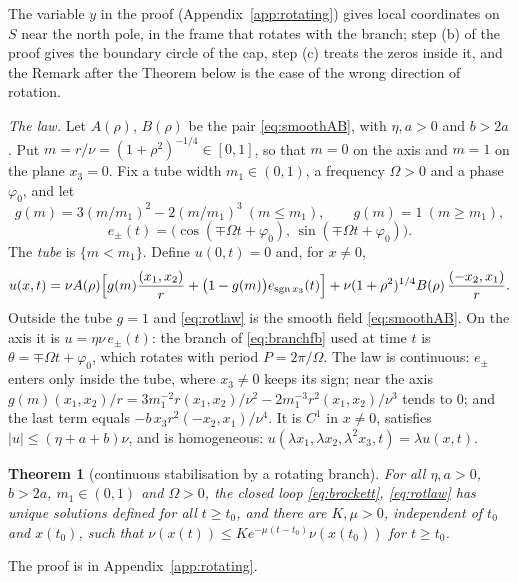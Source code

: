 \documentclass[11pt,reqno]{amsart}
\theoremstyle{plain}
\newtheorem*{theorem}{Theorem}
\theoremstyle{definition}
\theoremstyle{remark}
\begin{document}
The variable $y$ in the proof (Appendix~\ref{app:rotating}) gives local coordinates on $S$ near the north pole, in the frame that rotates with the branch; step (b) of the proof gives the boundary circle of the cap, step (c) treats the zeros inside it, and the
Remark after the Theorem below is the case of the wrong direction of rotation.

\emph{The law.} Let $A(\rho)$, $B(\rho)$ be the pair \eqref{eq:smoothAB}, with $\eta,a>0$ and $b>2a$. Put
$m=r/\nu=(1+\rho^{2})^{-1/4}\in[0,1]$, so that $m=0$ on the axis and $m=1$ on the plane $x_3=0$. Fix a tube
width $m_1\in(0,1)$, a frequency $\Omega>0$ and a phase $\varphi_0$, and let
\[
  g(m)=3(m/m_1)^{2}-2(m/m_1)^{3}\ (m\le m_1),\qquad g(m)=1\ (m\ge m_1),
\]
\[
  e_\pm(t)=\bigl(\cos(\mp\Omega t+\varphi_0),\,\sin(\mp\Omega t+\varphi_0)\bigr).
\]
The \emph{tube} is $\{m<m_1\}$. Define $u(0,t)=0$ and, for $x\neq0$,
\begin{equation}\label{eq:rotlaw}
  u(x,t)=\nu A(\rho)\Bigl[g(m)\frac{(x_1,x_2)}{r}+\bigl(1-g(m)\bigr)e_{\operatorname{sgn}x_3}(t)\Bigr]
  +\nu(1+\rho^{2})^{1/4}B(\rho)\,\frac{(-x_2,x_1)}{r}.
\end{equation}
Outside the tube $g=1$ and \eqref{eq:rotlaw} is the smooth field \eqref{eq:smoothAB}. On the axis it is
$u=\eta\nu\,e_\pm(t)$: the branch of \eqref{eq:branchfb} used at time $t$ is $\theta=\mp\Omega t+\varphi_0$,
which rotates with period $P=2\pi/\Omega$. The law is continuous: $e_\pm$ enters only inside the tube,
where $x_3\neq0$ keeps its sign; near the axis
$g(m)(x_1,x_2)/r=3m_1^{-2}r(x_1,x_2)/\nu^{2}-2m_1^{-3}r^{2}(x_1,x_2)/\nu^{3}$ tends to $0$; and the last term
equals $-b\,x_3r^{2}(-x_2,x_1)/\nu^{4}$. It is $C^{1}$ in $x\neq0$, satisfies $|u|\le(\eta+a+b)\nu$, and is
homogeneous: $u(\lambda x_1,\lambda x_2,\lambda^{2}x_3,t)=\lambda u(x,t)$.

\begin{theorem}[continuous stabilisation by a rotating branch]
For all $\eta,a>0$, $b>2a$, $m_1\in(0,1)$ and $\Omega>0$, the closed loop \eqref{eq:brockett},
\eqref{eq:rotlaw} has unique solutions defined for all $t\ge t_0$, and there are $K,\mu>0$, independent of
$t_0$ and $x(t_0)$, such that $\nu(x(t))\le Ke^{-\mu(t-t_0)}\nu(x(t_0))$ for $t\ge t_0$.
\end{theorem}

The proof is in Appendix~\ref{app:rotating}.
\end{document}
